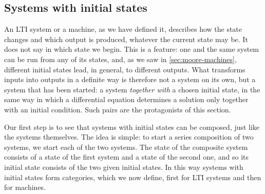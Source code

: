 \subsection{Systems with initial states}
\label{sec:systems-with-initial-states}
An LTI system or a machine, as we have defined it, describes how the state changes and which output is produced, whatever the current state may be.
It does not say in which state we begin.
This is a feature: one and the same system can be run from any of its states, and, as we saw in \cref{sec:moore-machines}, different initial states lead, in general, to different outputs.
What transforms inputs into outputs in a definite way is therefore not a system on its own, but a system that has been started: a system \emph{together with} a chosen initial state, in the same way in which a differential equation determines a solution only together with an initial condition.
Such pairs are the protagonists of this section.

Our first step is to see that systems with initial states can be composed, just like the systems themselves.
The idea is simple: to start a series composition of two systems, we start each of the two systems.
The state of the composite system consists of a state of the first system and a state of the second one, and so its initial state consists of the two given initial states.
In this way systems with initial states form categories, which we now define, first for LTI systems and then for machines.

